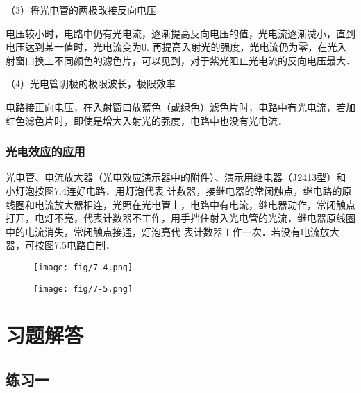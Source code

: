 （3）将光电管的两极改接反向电压

电压较小时，电路中仍有光电流，逐渐提高反向电压的值，光电流逐渐减小，直到电压达到某一值时，光电流变为0. 再提高入射光的强度，光电流仍为零，在光入射窗口换上不同颜色的滤色片，可以见到，对于紫光阻止光电流的反向电压最大．

（4）光电管阴极的极限波长，极限效率

电路接正向电压，在入射窗口放蓝色（或绿色）滤色片时，电路中有光电流，若加红色滤色片时，即使是增大入射光的强度，电路中也没有光电流．

\subsubsection{光电效应的应用}

光电管、电流放大器（光电效应演示器中的附件）、演示用继电器（J2413型）和小灯泡按图7.4连好电路．用灯泡代表
计数器，接继电器的常闭触点，继电路的原线圈和电流放大器相连，光照在光电管上，电路中有电流，继电器动作，常闭触点打开，电灯不亮，代表计数器不工作，用手挡住射入光电管的光流，继电器原线圈中的电流消失，常闭触点接通，灯泡亮代
表计数器工作一次．若没有电流放大器，可按图7.5电路自制．

\begin{figure}[htp]\centering
    \begin{minipage}[t]{0.48\textwidth}
    \centering
    \texttt{[image: fig/7-4.png]}
    \caption{}
    \end{minipage}
    \begin{minipage}[t]{0.48\textwidth}
    \centering
    \texttt{[image: fig/7-5.png]}
    \caption{}
    \end{minipage}
    \end{figure}


\section{习题解答}


\subsection{练习一}

